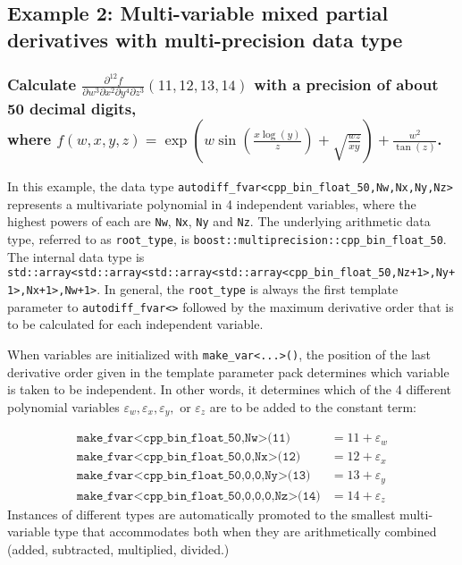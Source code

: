 \documentclass{article}
\begin{document}
\subsection{Example 2: Multi-variable mixed partial derivatives with multi-precision data type}
\subsubsection{Calculate $\frac{\partial^{12}f}{\partial w^{3}\partial x^{2}\partial y^{4}\partial z^{3}}(11,12,13,14)$
with a precision of about 50 decimal digits,\\
where $f(w,x,y,z)=\exp\left(w\sin\left(\frac{x\log(y)}{z}\right)+\sqrt{\frac{wz}{xy}}\right)+\frac{w^2}{\tan(z)}$.}

In this example, the data type {\tt autodiff\_fvar<cpp\_bin\_float\_50,Nw,Nx,Ny,Nz>} represents
a multivariate polynomial in 4 independent variables, where the highest powers of each are {\tt Nw}, {\tt Nx},
{\tt Ny} and {\tt Nz}. The underlying arithmetic data type, referred to as {\tt root\_type}, is
{\tt boost::multiprecision::cpp\_bin\_float\_50}. The internal data type is
{\tt std::array<std::array<std::array<std::array<cpp\_bin\_float\_50,Nz+1>,Ny+1>,Nx+1>,Nw+1>}. In general, the
{\tt root\_type} is always the first template parameter to {\tt autodiff\_fvar<>} followed by the maximum
derivative order that is to be calculated for each independent variable.

When variables are initialized with {\tt make\_var<...>()}, the position of the last derivative order given in
the template parameter pack determines which variable is taken to be independent. In other words, it determines
which of the 4 different polynomial variables $\varepsilon_w,\varepsilon_x,\varepsilon_y,$ or $\varepsilon_z$
are to be added to the constant term:

\begin{align*}
\texttt{make\_fvar<cpp\_bin\_float\_50,Nw>(11)} &= 11+\varepsilon_w \\
\texttt{make\_fvar<cpp\_bin\_float\_50,0,Nx>(12)} &= 12+\varepsilon_x \\
\texttt{make\_fvar<cpp\_bin\_float\_50,0,0,Ny>(13)} &= 13+\varepsilon_y \\
\texttt{make\_fvar<cpp\_bin\_float\_50,0,0,0,Nz>(14)} &= 14+\varepsilon_z
\end{align*}
Instances of different types are automatically promoted to the smallest multi-variable type that accommodates
both when they are arithmetically combined (added, subtracted, multiplied, divided.)
\end{document}
